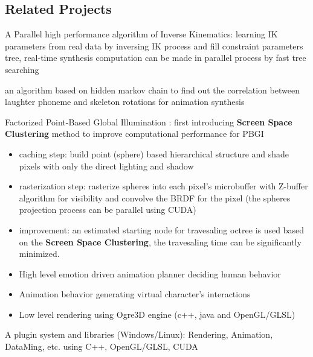 \subsection{Related Projects}
{
A Parallel high performance algorithm of Inverse Kinematics: learning IK parameters from real data by inversing IK process and fill constraint parameters tree, real-time synthesis computation can be made in parallel process by fast tree searching}

{
an algorithm based on hidden markov chain to find out the correlation between laughter phoneme and skeleton rotations for animation synthesis 
}

{
Factorized Point-Based Global Illumination : first introducing \textbf{Screen Space Clustering} method to improve computational performance for PBGI
\begin{itemize}
	\item caching step: build point (sphere) based hierarchical structure and shade pixels with only the direct lighting and shadow
	\item rasterization step: rasterize spheres into each pixel's microbuffer with Z-buffer algorithm for visibility and convolve the BRDF for the pixel (the spheres projection process can be parallel using CUDA)
	\item improvement: an estimated starting node for travesaling octree is used based on the \textbf{Screen Space Clustering}, the travesaling time can be significantly minimized.
\end{itemize}
}

{
\begin{itemize}
\item High level emotion driven animation planner deciding human behavior
\item Animation behavior generating virtual character's interactions
\item Low level rendering using Ogre3D engine (c++, java and OpenGL/GLSL)
\end{itemize}
}

{
A plugin system and libraries (Windows/Linux): Rendering, Animation, DataMing, etc.
using C++, OpenGL/GLSL, CUDA
}

